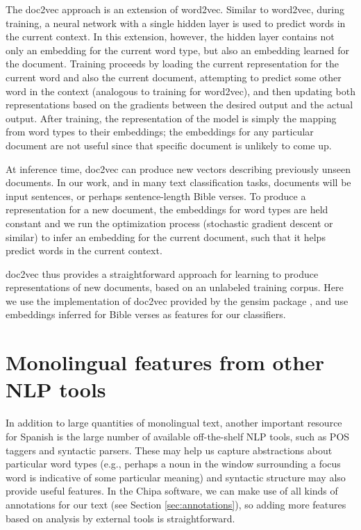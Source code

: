 The doc2vec approach is an extension of word2vec. Similar to word2vec, during
training, a neural network with a single hidden layer is used to predict words
in the current context. In this extension, however, the hidden layer contains
not only an embedding for the current word type, but also an embedding learned
for the document. Training proceeds by loading the current representation for
the current word and also the current document, attempting to predict some
other word in the context (analogous to training for word2vec), and then
updating both representations based on the gradients between the desired output
and the actual output. After training, the representation of the model is
simply the mapping from word types to their embeddings; the embeddings for any
particular document are not useful since that specific document is unlikely to
come up.

At inference time, doc2vec can produce new vectors describing previously unseen
documents. In our work, and in many text classification tasks, documents will
be input sentences, or perhaps sentence-length Bible verses.  To produce a
representation for a new document, the embeddings for word types are held
constant and we run the optimization process (stochastic gradient descent or
similar) to infer an embedding for the current document, such that it helps
predict words in the current context.

doc2vec thus provides a straightforward approach for learning to produce
representations of new documents, based on an unlabeled training corpus.  Here
we use the implementation of doc2vec provided by the gensim package
\cite{rehurek-lrec}, and use embeddings inferred for Bible verses as features
for our classifiers.

\section{Monolingual features from other NLP tools}
In addition to large quantities of monolingual text, another important resource
for Spanish is the large number of available off-the-shelf NLP tools, such as
POS taggers and syntactic parsers. These may help us capture abstractions about
particular word types (e.g., perhaps a noun in the window surrounding a focus
word is indicative of some particular meaning) and syntactic structure may also
provide useful features.  In the Chipa software, we can make use of all kinds
of annotations for our text (see Section \ref{sec:annotations}), so adding more
features based on analysis by external tools is straightforward.

